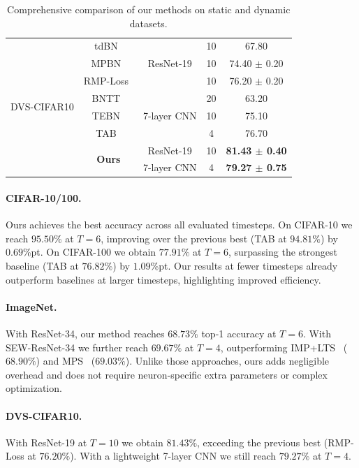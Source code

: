 \begin{table}[t!]
\begin{tabular}{ccccc}
\multirow{8}{*}{DVS-CIFAR10} & tdBN~\cite{zheng:2021} & \multirow{3}{*}{ResNet-19} & 10 & 67.80 \\
& MPBN~\cite{guo:2023_2} & & 10 & 74.40 $\pm$ 0.20 \\
& RMP-Loss~\cite{guo:2023} & & 10 & 76.20 $\pm$ 0.20 \\
\cline{2-5}
& BNTT~\cite{bntt:2020} & \multirow{3}{*}{7-layer CNN} & 20 & 63.20 \\
& TEBN~\cite{tebn:2022} & & 10 & 75.10 \\
& TAB~\cite{tab:2024} & & 4 & 76.70 \\
\cline{2-5}
& \multirow{2}{*}{\textbf{Ours}} & ResNet-19 & 10 & \textbf{81.43 $\pm$ 0.40} \\
&  & 7-layer CNN & 4 & \textbf{79.27 $\pm$ 0.75} \\
\bottomrule
\end{tabular}
\caption{Comprehensive comparison of our methods on static and dynamic datasets.}
\label{tab:comprehensive_results}
\end{table}

\paragraph{CIFAR-10/100.} Ours achieves the best accuracy across all evaluated timesteps. On CIFAR-10 we reach $95.50\%$ at $T=6$, improving over the previous best (TAB at $94.81\%$) by $0.69$\%pt. On CIFAR-100 we obtain $77.91\%$ at $T=6$, surpassing the strongest baseline (TAB at $76.82\%$) by $1.09$\%pt. Our results at fewer timesteps already outperform baselines at larger timesteps, highlighting improved efficiency.

\paragraph{ImageNet.} With ResNet-34, our method reaches $68.73\%$ top-1 accuracy at $T=6$. With SEW-ResNet-34 we further reach $69.67\%$ at $T=4$, outperforming IMP+LTS~\cite{shen:2024} ($68.90\%$) and MPS~\cite{ding:2025} ($69.03\%$). Unlike those approaches, ours adds negligible overhead and does not require neuron-specific extra parameters or complex optimization.

\paragraph{DVS-CIFAR10.} With ResNet-19 at $T=10$ we obtain $81.43\%$, exceeding the previous best (RMP-Loss at $76.20\%$). With a lightweight 7-layer CNN we still reach $79.27\%$ at $T=4$.

